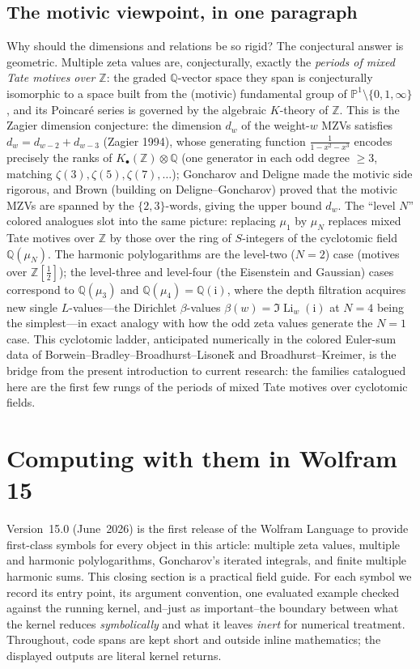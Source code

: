 \documentclass[11pt]{article}
\DeclareMathOperator{\Li}{Li}
\newcommand{\iu}{\mathrm{i}}
\theoremstyle{plain}
\theoremstyle{remark}
\begin{document}
\subsection{The motivic viewpoint, in one paragraph}

Why should the dimensions and relations be so rigid? The conjectural answer is geometric. Multiple zeta values are, conjecturally, exactly the \emph{periods of mixed Tate motives over $\mathbb{Z}$}: the graded $\mathbb{Q}$-vector space they span is conjecturally isomorphic to a space built from the (motivic) fundamental group of $\mathbb{P}^1\setminus\{0,1,\infty\}$, and its Poincar\'e series is governed by the algebraic $K$-theory of $\mathbb{Z}$. This is the Zagier dimension conjecture: the dimension $d_w$ of the weight-$w$ MZVs satisfies $d_w=d_{w-2}+d_{w-3}$ (Zagier 1994), whose generating function $\frac{1}{1-x^2-x^3}$ encodes precisely the ranks of $K_\bullet(\mathbb{Z})\otimes\mathbb{Q}$ (one generator in each odd degree $\ge3$, matching $\zeta(3),\zeta(5),\zeta(7),\dots$); Goncharov and Deligne made the motivic side rigorous, and Brown (building on Deligne--Goncharov) proved that the motivic MZVs are spanned by the $\{2,3\}$-words, giving the upper bound $d_w$. The ``level $N$'' colored analogues slot into the same picture: replacing $\mu_1$ by $\mu_N$ replaces mixed Tate motives over $\mathbb{Z}$ by those over the ring of $S$-integers of the cyclotomic field $\mathbb{Q}(\mu_N)$. The harmonic polylogarithms are the level-two ($N=2$) case (motives over $\mathbb{Z}[\tfrac12]$); the level-three and level-four (the Eisenstein and Gaussian) cases correspond to $\mathbb{Q}(\mu_3)$ and $\mathbb{Q}(\mu_4)=\mathbb{Q}(\iu)$, where the depth filtration acquires new single $L$-values---the Dirichlet $\beta$-values $\beta(w)=\Im\Li_w(\iu)$ at $N=4$ being the simplest---in exact analogy with how the odd zeta values generate the $N=1$ case. This cyclotomic ladder, anticipated numerically in the colored Euler-sum data of Borwein--Bradley--Broadhurst--Lisone\v{k} and Broadhurst--Kreimer, is the bridge from the present introduction to current research: the families catalogued here are the first few rungs of the periods of mixed Tate motives over cyclotomic fields.


\section{Computing with them in Wolfram 15}

Version~15.0 (June~2026) is the first release of the Wolfram Language to provide first-class symbols for every object in this article: multiple zeta values, multiple and harmonic polylogarithms, Goncharov's iterated integrals, and finite multiple harmonic sums. This closing section is a practical field guide. For each symbol we record its entry point, its argument convention, one evaluated example checked against the running kernel, and--just as important--the boundary between what the kernel reduces \emph{symbolically} and what it leaves \emph{inert} for numerical treatment. Throughout, code spans are kept short and outside inline mathematics; the displayed outputs are literal kernel returns.
\end{document}
